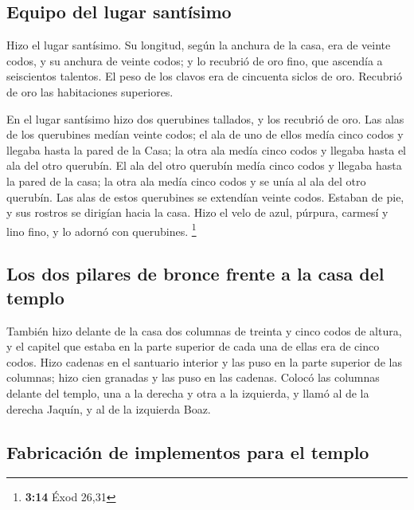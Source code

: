 \hypertarget{equipo-del-lugar-santuxedsimo}{%
\subsection{Equipo del lugar
santísimo}\label{equipo-del-lugar-santuxedsimo}}

 Hizo el lugar santísimo. Su longitud, según la anchura de
la casa, era de veinte codos, y su anchura de veinte codos; y lo
recubrió de oro fino, que ascendía a seiscientos talentos.
 El peso de los clavos era de cincuenta siclos de oro.
Recubrió de oro las habitaciones superiores.

 En el lugar santísimo hizo dos querubines tallados, y
los recubrió de oro.  Las alas de los querubines medían
veinte codos; el ala de uno de ellos medía cinco codos y llegaba hasta
la pared de la Casa; la otra ala medía cinco codos y llegaba hasta el
ala del otro querubín.  El ala del otro querubín medía
cinco codos y llegaba hasta la pared de la casa; la otra ala medía cinco
codos y se unía al ala del otro querubín.  Las alas de
estos querubines se extendían veinte codos. Estaban de pie, y sus
rostros se dirigían hacia la casa.  Hizo el velo de azul,
púrpura, carmesí y lino fino, y lo adornó con querubines. \footnote{\textbf{3:14}
  Éxod 26,31}

\hypertarget{los-dos-pilares-de-bronce-frente-a-la-casa-del-templo}{%
\subsection{Los dos pilares de bronce frente a la casa del
templo}\label{los-dos-pilares-de-bronce-frente-a-la-casa-del-templo}}

 También hizo delante de la casa dos columnas de treinta
y cinco codos de altura, y el capitel que estaba en la parte superior de
cada una de ellas era de cinco codos.  Hizo cadenas en el
santuario interior y las puso en la parte superior de las columnas; hizo
cien granadas y las puso en las cadenas.  Colocó las
columnas delante del templo, una a la derecha y otra a la izquierda, y
llamó al de la derecha Jaquín, y al de la izquierda Boaz.

\hypertarget{fabricaciuxf3n-de-implementos-para-el-templo}{%
\subsection{Fabricación de implementos para el
templo}\label{fabricaciuxf3n-de-implementos-para-el-templo}}

